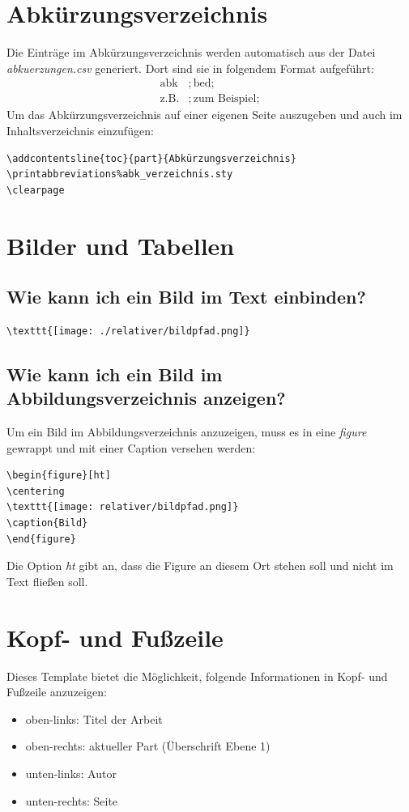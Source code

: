\documentclass[12pt]{article}
\begin{document}
\section{Abkürzungsverzeichnis}
Die Einträge im Abkürzungsverzeichnis werden automatisch aus der Datei \textit{abkuerzungen.csv} generiert. Dort sind sie in folgendem Format aufgeführt:
\begin{align*}
\text{abk}&;\text{bed};\\
\text{z.B.} &;\text{zum Beispiel};
\end{align*}
\noindent Um das Abkürzungsverzeichnis auf einer eigenen Seite auszugeben und auch im Inhaltsverzeichnis einzufügen:
\begin{verbatim}
\addcontentsline{toc}{part}{Abkürzungsverzeichnis}
\printabbreviations%abk_verzeichnis.sty
\clearpage
\end{verbatim}

\section{Bilder und Tabellen}
\subsection{Wie kann ich ein Bild im Text einbinden?}
\begin{verbatim}
\texttt{[image: ./relativer/bildpfad.png]}
\end{verbatim}

\subsection{Wie kann ich ein Bild im Abbildungsverzeichnis anzeigen?}
Um ein Bild im Abbildungsverzeichnis anzuzeigen, muss es in eine \textit{figure} gewrappt und mit einer Caption versehen werden:
\begin{verbatim}
\begin{figure}[ht]
\centering
\texttt{[image: relativer/bildpfad.png]}
\caption{Bild}
\end{figure}
\end{verbatim}
\noindent Die Option \textit{ht} gibt an, dass die Figure an diesem Ort stehen soll und nicht im Text fließen soll.

\section{Kopf- und Fußzeile}
Dieses Template bietet die Möglichkeit, folgende Informationen in Kopf- und Fußzeile anzuzeigen:
\begin{itemize}
\item oben-links: Titel der Arbeit
\item oben-rechts: aktueller Part (Überschrift Ebene 1)
\item unten-links: Autor
\item unten-rechts: Seite
\end{itemize}
\end{document}
